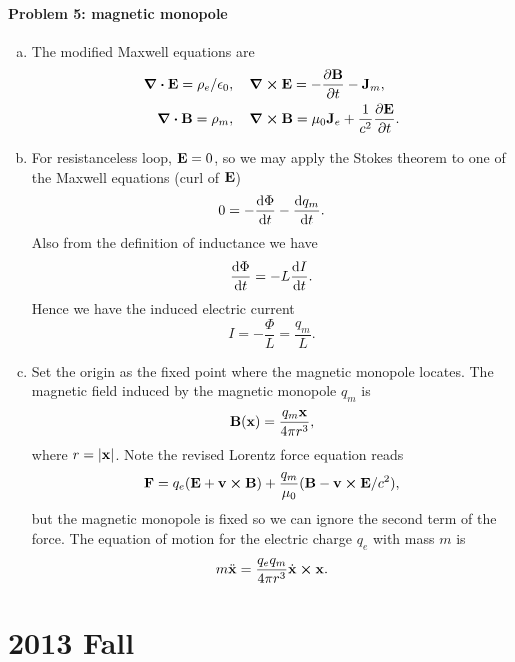 \documentclass[10pt]{article}
\begin{document}
\subsection{Problem 5: magnetic monopole}
\begin{enumerate}[(a)]
	\item The modified Maxwell equations are 
		\begin{align*}
			\div{\vb{E}} = \rho_e / \epsilon_0&\qc \curl{\vb{E}} = -\pdv{\vb{B}}{t} - \vb{J}_m , \\
			\div{\vb{B}} = \rho_m &\qc \curl{\vb{B}} = \mu_0 \vb{J}_e + \frac{1}{c^2} \pdv{\vb{E}}{t}.
		\end{align*}
	\item For resistanceless loop, $\vb{E}= 0$, so we may apply the Stokes theorem to one of the Maxwell equations (curl of $\vb{E}$)
		\begin{equation}
			0 = - \dv{\Phi}{t} - \dv{q_m}{t}.
		\end{equation}
		Also from the definition of inductance we have 
		\begin{equation}
			\dv{\Phi}{t} = -L \dv{I}{t}.
		\end{equation}
		Hence we have the induced electric current 
		\begin{equation}
			I = - \frac{\Phi}{L} = \frac{q_m}{L}.
		\end{equation}
	\item Set the origin as the fixed point where the magnetic monopole locates. The magnetic field induced by the magnetic monopole $q_m$ is 
		\begin{equation}
			\vb{B}(\vb{x}) = \frac{q_m \vb{x}}{4\pi r^3},
		\end{equation}
		where $r = \abs{\vb{x}}$.
		Note the revised Lorentz force equation reads
		\begin{equation}
			\vb{F} = q_e (\vb{E} + \vb{v} \cross \vb{B}) + \frac{q_m}{\mu_0} (\vb{B} - \vb{v} \cross \vb{E} /c^2),
		\end{equation}
		but the magnetic monopole is fixed so we can ignore the second term of the force. 
		The equation of motion for the electric charge $q_e$ with mass $m$ is 
		\begin{equation}
			m \ddot{\vb{x}} = \frac{q_e q_m}{4\pi r^3} \dot{\vb{x}} \cross \vb{x}.
		\end{equation}
\end{enumerate}
\newpage
\part{2013 Fall}
\end{document}
